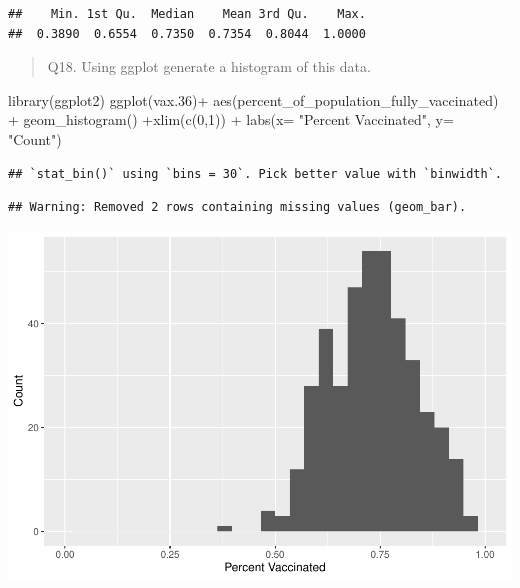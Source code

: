 \documentclass[
]{article}
\newenvironment{Shaded}{\begin{snugshade}}{\end{snugshade}}
\newcommand{\AttributeTok}[1]{\textcolor[rgb]{0.77,0.63,0.00}{#1}}
\newcommand{\DecValTok}[1]{\textcolor[rgb]{0.00,0.00,0.81}{#1}}
\newcommand{\FloatTok}[1]{\textcolor[rgb]{0.00,0.00,0.81}{#1}}
\newcommand{\FunctionTok}[1]{\textcolor[rgb]{0.00,0.00,0.00}{#1}}
\newcommand{\NormalTok}[1]{#1}
\newcommand{\SpecialCharTok}[1]{\textcolor[rgb]{0.00,0.00,0.00}{#1}}
\newcommand{\StringTok}[1]{\textcolor[rgb]{0.31,0.60,0.02}{#1}}
\begin{document}
\begin{Shaded}
\end{Shaded}

\begin{verbatim}
##    Min. 1st Qu.  Median    Mean 3rd Qu.    Max. 
##  0.3890  0.6554  0.7350  0.7354  0.8044  1.0000
\end{verbatim}

\begin{quote}
Q18. Using ggplot generate a histogram of this data.
\end{quote}

\begin{Shaded}
\begin{Highlighting}[]
\FunctionTok{library}\NormalTok{(ggplot2)}
\FunctionTok{ggplot}\NormalTok{(vax}\FloatTok{.36}\NormalTok{)}\SpecialCharTok{+} \FunctionTok{aes}\NormalTok{(percent\_of\_population\_fully\_vaccinated) }\SpecialCharTok{+} \FunctionTok{geom\_histogram}\NormalTok{() }\SpecialCharTok{+}\FunctionTok{xlim}\NormalTok{(}\FunctionTok{c}\NormalTok{(}\DecValTok{0}\NormalTok{,}\DecValTok{1}\NormalTok{)) }\SpecialCharTok{+} \FunctionTok{labs}\NormalTok{(}\AttributeTok{x=} \StringTok{"Percent Vaccinated"}\NormalTok{, }\AttributeTok{y=} \StringTok{"Count"}\NormalTok{)}
\end{Highlighting}
\end{Shaded}

\begin{verbatim}
## `stat_bin()` using `bins = 30`. Pick better value with `binwidth`.
\end{verbatim}

\begin{verbatim}
## Warning: Removed 2 rows containing missing values (geom_bar).
\end{verbatim}

\includegraphics{COVID-19-Vax-mini-project_files/figure-latex/unnamed-chunk-34-1.pdf}
\end{document}
